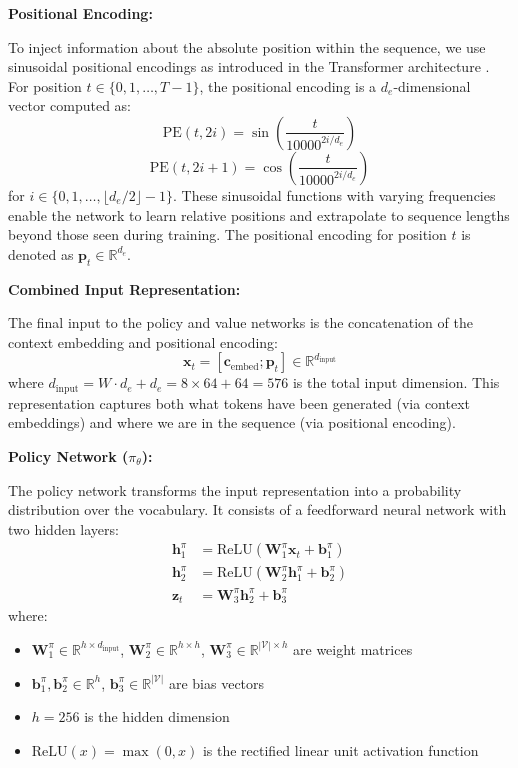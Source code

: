 \documentclass[conference]{IEEEtran}
\begin{document}
\textbf{Positional Encoding:}

To inject information about the absolute position within the sequence, we use sinusoidal positional encodings as introduced in the Transformer architecture \cite{vaswani2017attention}. For position $t \in \{0, 1, \ldots, T-1\}$, the positional encoding is a $d_e$-dimensional vector computed as:
\begin{equation}
\text{PE}(t, 2i) = \sin\left(\frac{t}{10000^{2i/d_e}}\right)
\end{equation}
\begin{equation}
\text{PE}(t, 2i+1) = \cos\left(\frac{t}{10000^{2i/d_e}}\right)
\end{equation}
for $i \in \{0, 1, \ldots, \lfloor d_e/2 \rfloor - 1\}$. These sinusoidal functions with varying frequencies enable the network to learn relative positions and extrapolate to sequence lengths beyond those seen during training. The positional encoding for position $t$ is denoted as $\mathbf{p}_t \in \mathbb{R}^{d_e}$.

\textbf{Combined Input Representation:}

The final input to the policy and value networks is the concatenation of the context embedding and positional encoding:
\begin{equation}
\mathbf{x}_t = [\mathbf{c}_{\text{embed}}; \mathbf{p}_t] \in \mathbb{R}^{d_{\text{input}}}
\end{equation}
where $d_{\text{input}} = W \cdot d_e + d_e = 8 \times 64 + 64 = 576$ is the total input dimension. This representation captures both what tokens have been generated (via context embeddings) and where we are in the sequence (via positional encoding).

\textbf{Policy Network ($\pi_\theta$):}

The policy network transforms the input representation into a probability distribution over the vocabulary. It consists of a feedforward neural network with two hidden layers:
\begin{align}
\mathbf{h}_1^{\pi} &= \text{ReLU}(\mathbf{W}_1^{\pi} \mathbf{x}_t + \mathbf{b}_1^{\pi}) \\
\mathbf{h}_2^{\pi} &= \text{ReLU}(\mathbf{W}_2^{\pi} \mathbf{h}_1^{\pi} + \mathbf{b}_2^{\pi}) \\
\mathbf{z}_t &= \mathbf{W}_3^{\pi} \mathbf{h}_2^{\pi} + \mathbf{b}_3^{\pi}
\end{align}
where:
\begin{itemize}
    \item $\mathbf{W}_1^{\pi} \in \mathbb{R}^{h \times d_{\text{input}}}$, $\mathbf{W}_2^{\pi} \in \mathbb{R}^{h \times h}$, $\mathbf{W}_3^{\pi} \in \mathbb{R}^{|\mathcal{V}| \times h}$ are weight matrices
    \item $\mathbf{b}_1^{\pi}, \mathbf{b}_2^{\pi} \in \mathbb{R}^{h}$, $\mathbf{b}_3^{\pi} \in \mathbb{R}^{|\mathcal{V}|}$ are bias vectors
    \item $h = 256$ is the hidden dimension
    \item $\text{ReLU}(x) = \max(0, x)$ is the rectified linear unit activation function
\end{itemize}
\end{document}
